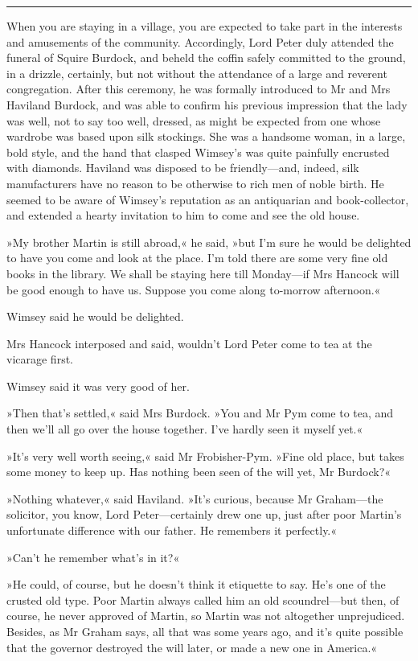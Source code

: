 \noindent\hfil\rule{0.5\textwidth}{.4pt}\hfil 

When you are staying in a village, you are expected to take part in the interests and amusements of the community. Accordingly, Lord Peter duly attended the funeral of Squire Burdock, and beheld the coffin safely committed to the ground, in a drizzle, certainly, but not without the attendance of a large and reverent congregation. After this ceremony, he was formally introduced to Mr and Mrs Haviland Burdock, and was able to confirm his previous impression that the lady was well, not to say too well, dressed, as might be expected from one whose wardrobe was based upon silk stockings. She was a handsome woman, in a large, bold style, and the hand that clasped Wimsey's was quite painfully encrusted with diamonds. Haviland was disposed to be friendly—and, indeed, silk manufacturers have no reason to be otherwise to rich men of noble birth. He seemed to be aware of Wimsey's reputation as an antiquarian and book-collector, and extended a hearty invitation to him to come and see the old house.

»My brother Martin is still abroad,« he said, »but I'm sure he would be delighted to have you come and look at the place. I'm told there are some very fine old books in the library. We shall be staying here till Monday—if Mrs Hancock will be good enough to have us. Suppose you come along to-morrow afternoon.«

Wimsey said he would be delighted.

Mrs Hancock interposed and said, wouldn't Lord Peter come to tea at the vicarage first.

Wimsey said it was very good of her.

»Then that's settled,« said Mrs Burdock. »You and Mr Pym come to tea, and then we'll all go over the house together. I've hardly seen it myself yet.«

»It's very well worth seeing,« said Mr Frobisher-Pym. »Fine old place, but takes some money to keep up. Has nothing been seen of the will yet, Mr Burdock?«

»Nothing whatever,« said Haviland. »It's curious, because Mr Graham—the solicitor, you know, Lord Peter—certainly drew one up, just after poor Martin's unfortunate difference with our father. He remembers it perfectly.«

»Can't he remember what's in it?«

»He could, of course, but he doesn't think it etiquette to say. He's one of the crusted old type. Poor Martin always called him an old scoundrel—but then, of course, he never approved of Martin, so Martin was not altogether unprejudiced. Besides, as Mr Graham says, all that was some years ago, and it's quite possible that the governor destroyed the will later, or made a new one in America.«

